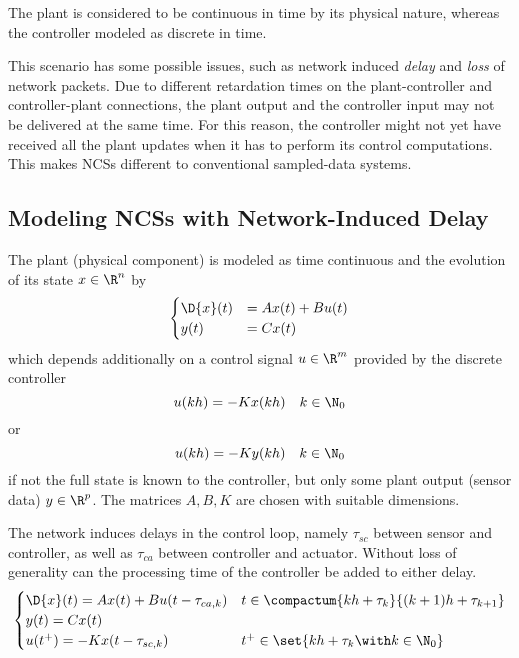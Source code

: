 
    The plant is considered to be continuous in time by its physical nature, whereas the controller modeled as discrete in time.

    This scenario has some possible issues, such as network induced \emph{delay} and \emph{loss} of network packets.
    Due to different retardation times on the plant-controller and controller-plant connections, the plant output and the controller input may not be delivered at the same time. For this reason, the controller might not yet have received all the plant updates when it has to perform its control computations. This makes NCSs different to conventional sampled-data systems.

    \subsection{Modeling NCSs with Network-Induced Delay}
        The plant (physical component) is modeled as time continuous and the evolution of its state $x\in\R^{n}$ by
        \begin{equation*}
            \begin{cases}
                \D{x}(t) &= Ax(t) + Bu(t) \\
                y(t) &= Cx(t)
            \end{cases}
        \end{equation*}
        which depends additionally on a control signal $u\in\R^{m}$ provided by the discrete controller
        \begin{equation*}
            u(kh) = -Kx(kh)\quad k\in\N_0
        \end{equation*}
        or
        \begin{equation*}
            u(kh) = -Ky(kh)\quad k\in\N_0
        \end{equation*}
        if not the full state is known to the controller, but only some plant output (sensor data) $y\in\R^{p}$.
        The matrices $A, B, K$ are chosen with suitable dimensions. 

        The network induces delays in the control loop, namely $\tau_{sc}$ between sensor and controller, as well as $\tau_{ca}$ between controller and actuator. Without loss of generality can the processing time of the controller be added to either delay.
        \begin{equation*}
            \begin{cases}
                \D{x}(t) = Ax(t) + Bu(t-\tau_{ca,k}) &
                t\in\compactum{kh+\tau_k}{(k+1)h+\tau_{k+1}}\\
                y(t) = Cx(t) &\\
                u(t^+) = -Kx(t-\tau_{sc,k}) &
                t^+\in\set{kh+\tau_k\with k\in\N_0}
            \end{cases}
        \end{equation*}

